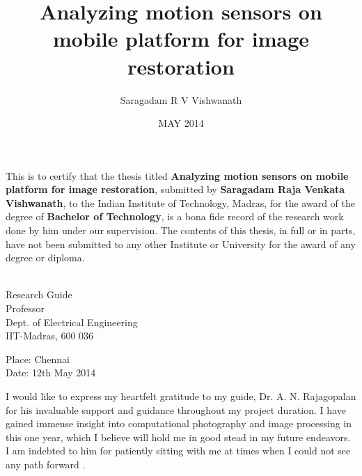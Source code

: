 \documentclass[BTech]{iitmdiss}
\begin{document}
\title{Analyzing motion sensors on mobile platform for image restoration}
\author{Saragadam R V Vishwanath}
\date{MAY 2014}
\maketitle
\pagebreak

\certificate

\vspace*{0.5in}

\noindent This is to certify that the thesis titled {\bf Analyzing
 motion sensors on mobile platform for image restoration}, submitted by
  {\bf Saragadam Raja Venkata Vishwanath}, 
  to the Indian Institute of Technology, Madras, for
the award of the degree of {\bf Bachelor of Technology}, is a bona fide
record of the research work done by him under our supervision.  The
contents of this thesis, in full or in parts, have not been submitted
to any other Institute or University for the award of any degree or
diploma.

\vspace*{1.5in}

\begin{singlespacing}
\hspace*{-0.25in}
\parbox{2.5in}{
 \\
\noindent Research Guide \\ 
\noindent Professor \\
\noindent Dept. of Electrical Engineering\\
\noindent IIT-Madras, 600 036 \\
} 
\hspace*{1.0in} 
\end{singlespacing}
\vspace*{0.25in}
\noindent Place: Chennai\\
Date: 12th May 2014

\pagebreak

\acknowledgements

I would like to express my heartfelt gratitude to my guide, 
Dr. A. N. Rajagopalan for his invaluable support and guidance throughout
my project duration. I have gained immense insight into computational
photography and image processing in this one year, which I believe will 
hold me in good stead in my future endeavors. I am indebted to him for
patiently sitting with me at times when I could not see any path forward
. 
\end{document}

